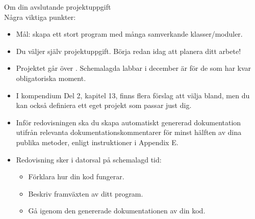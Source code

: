 \begin{Slide}{Om din avslutande projektuppgift}\SlideFontSmall
{} \\
Några viktiga punkter:
\begin{itemize}
\item Mål: skapa ett stort program med många samverkande klasser/moduler.
\item Du väljer själv projektuppgift. Börja redan idag att planera ditt arbete!
\item Projektet går över . Schemalagda labbar i december är  för de som har kvar obligatoriska moment.

\item I kompendium Del 2, kapitel 13, finns flera förslag att välja bland, men du kan också definiera ett eget projekt som passar just dig.


\item Inför redovisningen ska du skapa automatiskt genererad dokumentation utifrån relevanta dokumentationskommentarer för minst hälften av dina publika metoder, enligt instruktioner i Appendix E.

\item Redovisning sker i datorsal på schemalagd tid:
\begin{itemize}\SlideFontTiny
  \item Förklara hur din kod fungerar.
  \item Beskriv framväxten av ditt program.
  \item Gå igenom den genererade dokumentationen av din kod.
\end{itemize}
\end{itemize}

\end{Slide}

